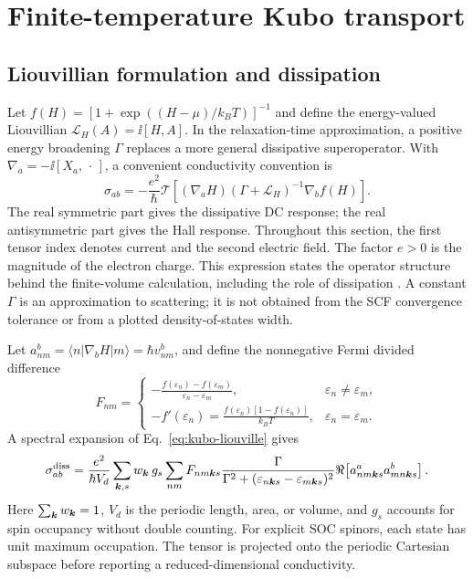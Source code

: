 \section{Finite-temperature Kubo transport}
\label{sec:kubo}
\subsection{Liouvillian formulation and dissipation}
Let $f(H)=[1+\exp((H-\mu)/k_BT)]^{-1}$ and define the energy-valued
Liouvillian $\mathcal L_H(A)=\ii[H,A]$. In the relaxation-time
approximation, a positive energy broadening $\Gamma$ replaces a
more general dissipative superoperator. With
$\nabla_a=-\ii[X_a,\,\cdot\,]$, a convenient conductivity convention is
\begin{equation}
 \sigma_{ab}=-\frac{e^2}{\hbar}
 \mathcal T\!\left[
   (\nabla_aH)(\Gamma+\mathcal L_H)^{-1}\nabla_b f(H)
 \right].
 \label{eq:kubo-liouville}
\end{equation}
The real symmetric part gives the dissipative DC response; the real
antisymmetric part gives the Hall response. Throughout this section,
the first tensor index denotes current and the second electric field.
The factor $e>0$ is the magnitude of the electron charge.
This expression states the operator structure behind the
finite-volume calculation, including the role of dissipation
\cite{KuehneTransport2020}. A constant $\Gamma$ is an approximation to
scattering; it is not obtained from the SCF convergence tolerance or
from a plotted density-of-states width.

Let $a^b_{nm}=\langle n|\nabla_bH|m\rangle=\hbar v^b_{nm}$, and define
the nonnegative Fermi divided difference
\begin{equation}
 F_{nm}=
 \begin{cases}
 \displaystyle-\frac{f(\varepsilon_n)-f(\varepsilon_m)}
 {\varepsilon_n-\varepsilon_m},&\varepsilon_n\ne\varepsilon_m,\\[0.7em]
 \displaystyle-f'(\varepsilon_n)
 =\frac{f(\varepsilon_n)[1-f(\varepsilon_n)]}{k_BT},
 &\varepsilon_n=\varepsilon_m .
 \end{cases}
 \label{eq:fermi-divided}
\end{equation}
A spectral expansion of Eq.~\eqref{eq:kubo-liouville} gives
\begin{equation}
 \sigma^{\mathrm{diss}}_{ab}
 =\frac{e^2}{\hbar V_d}
 \sum_{\bm{k},s}w_{\bm{k}}\,g_s
 \sum_{nm}F_{nm\bm{k} s}
 \frac{\Gamma}{\Gamma^2+(\varepsilon_{n\bm{k} s}-\varepsilon_{m\bm{k} s})^2}
 \Re\!\left[a^a_{nm\bm{k} s}a^b_{mn\bm{k} s}\right].
 \label{eq:kubo-spectral}
\end{equation}
Here $\sum_{\bm{k}} w_{\bm{k}}=1$, $V_d$ is the periodic length, area, or
volume, and $g_s$ accounts for spin occupancy without double counting.
For explicit SOC spinors, each state has unit maximum occupation.
The tensor is projected onto the periodic Cartesian subspace before
reporting a reduced-dimensional conductivity.

